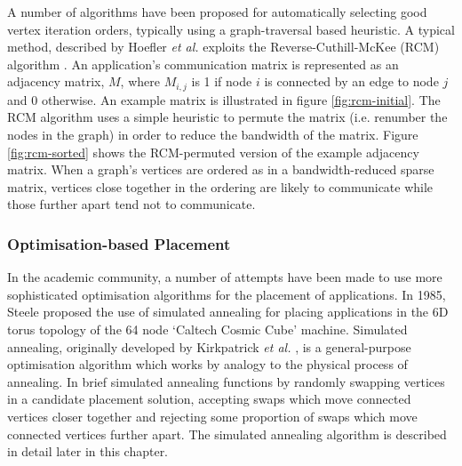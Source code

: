 				A number of algorithms have been proposed for automatically selecting
				good vertex iteration orders, typically using a graph-traversal based
				heuristic. A typical method, described by Hoefler \emph{et al.}
				\cite{hoefler11} exploits the Reverse-Cuthill-McKee (RCM) algorithm
				\cite{cuthill69}. An application's communication matrix is represented
				as an adjacency matrix, $M$, where $M_{i,j}$ is 1 if node $i$ is
				connected by an edge to node $j$ and 0 otherwise. An example matrix is
				illustrated in figure \ref{fig:rcm-initial}. The RCM algorithm uses a
				simple heuristic to permute the matrix (i.e. renumber the nodes in the
				graph) in order to reduce the bandwidth of the matrix. Figure
				\ref{fig:rcm-sorted} shows the RCM-permuted version of the example
				adjacency matrix. When a graph's vertices are ordered as in a
				bandwidth-reduced sparse matrix, vertices close together in the
				ordering are likely to communicate while those further apart tend not
				to communicate.
				
			\subsubsection{Optimisation-based Placement}
				
				
				In the academic community, a number of attempts have been made to use
				more sophisticated optimisation algorithms for the placement of
				applications. In 1985, Steele \cite{steele85} proposed the use of
				simulated annealing for placing applications in the 6D torus topology
				of the 64 node `Caltech Cosmic Cube' machine. Simulated annealing,
				originally developed by Kirkpatrick \emph{et al.} \cite{kirkpatrick83},
				is a general-purpose optimisation algorithm which works by analogy to
				the physical process of annealing. In brief simulated annealing
				functions by randomly swapping vertices in a candidate placement
				solution, accepting swaps which move connected vertices closer together
				and rejecting some proportion of swaps which move connected vertices
				further apart. The simulated annealing algorithm is described in detail
				later in this chapter.
				
